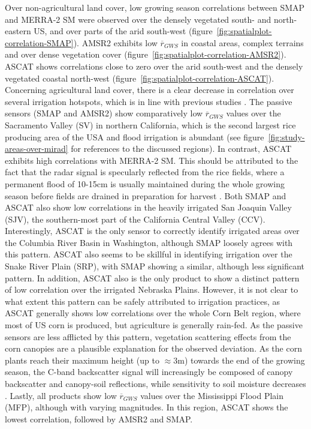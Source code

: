 \documentclass[hess, manuscript]{copernicus}
\begin{document}
Over non-agricultural land cover, low growing season correlations between SMAP and MERRA-2 SM were observed over the densely vegetated south- and north-eastern US, and over parts of the arid south-west (figure~\ref{fig:spatialplot-correlation-SMAP}). AMSR2 exhibits low $\overline{r}_{GWS}$ in coastal areas, complex terrains and over dense vegetation cover (figure~\ref{fig:spatialplot-correlation-AMSR2}). ASCAT shows correlations close to zero over the arid south-west and the densely vegetated coastal north-west (figure~\ref{fig:spatialplot-correlation-ASCAT}). Concerning agricultural land cover, there is a clear decrease in correlation over several irrigation hotspots, which is in line with previous studies \citep{escorihuela2016comparison}. The passive sensors (SMAP and AMSR2) show comparatively low $\overline{r}_{GWS}$ values over the Sacramento Valley (SV) in northern California, which is the second largest rice producing area of the USA \citep{nass2012census} and flood irrigation is abundant (see figure~\ref{fig:study-areas-over-mirad} for references to the discussed regions). In contrast, ASCAT exhibits high correlations with MERRA-2 SM. This should be attributed to the fact that the radar signal is specularly reflected from the rice fields, where a permanent flood of 10-15\si{\cm} is usually maintained during the whole growing season before fields are drained in preparation for harvest \citep{Linquist2015}. Both SMAP and ASCAT also show low correlations in the heavily irrigated San Joaquin Valley (SJV), the southern-most part of the California Central Valley (CCV). Interestingly, ASCAT is the only sensor to correctly identify irrigated areas over the Columbia River Basin in Washington, although SMAP loosely agrees with this pattern. ASCAT also seems to be skillful in identifying irrigation over the Snake River Plain (SRP), with SMAP showing a similar, although less significant pattern. In addition, ASCAT also is the only product to show a distinct pattern of low correlation over the irrigated Nebraska Plains. However, it is not clear to what extent this pattern can be safely attributed to irrigation practices, as ASCAT generally shows low correlations over the whole Corn Belt region, where most of US corn is produced, but agriculture is generally rain-fed. As the passive sensors are less afflicted by this pattern, vegetation scattering effects from the corn canopies are a plausible explanation for the observed deviation. As the corn plants reach their maximum height (up to $\approx 3\si{\m}$) towards the end of the growing season, the C-band backscatter signal will increasingly be composed of canopy backscatter and canopy-soil reflections, while sensitivity to soil moisture decreases \citep{daughtry1991c,joseph2010effects}. Lastly, all products show low $\overline{r}_{GWS}$ values over the Mississippi Flood Plain (MFP), although with varying magnitudes. In this region, ASCAT shows the lowest correlation, followed by AMSR2 and SMAP.\\
\end{document}
